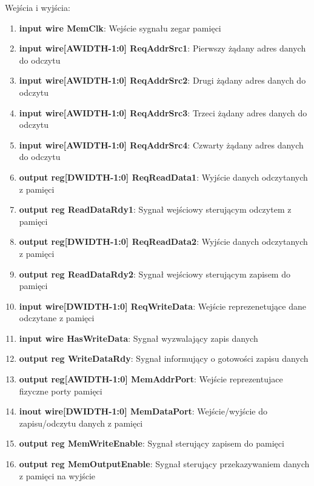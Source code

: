 \documentclass[12pt, a4paper]{article}
\begin{document}
Wejścia i wyjścia:
\begin{enumerate}
    \item \textbf{\fontsize{11}{10}\selectfont input wire MemClk}: Wejście sygnału zegar pamięci
    \item \textbf{\fontsize{11}{10}\selectfont input wire[AWIDTH-1:0] ReqAddrSrc1}: Pierwszy żądany adres danych do odczytu 
    \item \textbf{\fontsize{11}{10}\selectfont input wire[AWIDTH-1:0] ReqAddrSrc2}: Drugi żądany adres danych do odczytu 
    \item \textbf{\fontsize{11}{10}\selectfont input wire[AWIDTH-1:0] ReqAddrSrc3}: Trzeci żądany adres danych do odczytu 
    \item \textbf{\fontsize{11}{10}\selectfont input wire[AWIDTH-1:0] ReqAddrSrc4}: Czwarty żądany adres danych do odczytu 
    \item \textbf{\fontsize{11}{10}\selectfont output reg[DWIDTH-1:0] ReqReadData1}: Wyjście danych odczytanych z pamięci
    \item \textbf{\fontsize{11}{10}\selectfont output reg ReadDataRdy1}: Sygnał wejściowy sterującym odczytem z pamięci
    \item \textbf{\fontsize{11}{10}\selectfont output reg[DWIDTH-1:0] ReqReadData2}: Wyjście danych odczytanych z pamięci
    \item \textbf{\fontsize{11}{10}\selectfont output reg ReadDataRdy2}: Sygnał wejściowy sterującym zapisem do pamięci
    \item \textbf{\fontsize{11}{10}\selectfont input wire[DWIDTH-1:0] ReqWriteData}: Wejście reprezenetujące dane odczytane z pamięci
    \item \textbf{\fontsize{11}{10}\selectfont input wire HasWriteData}: Sygnał wyzwalający zapis danych
    \item \textbf{\fontsize{11}{10}\selectfont output reg WriteDataRdy}: Sygnał informujący o gotowości zapisu danych
    \item \textbf{\fontsize{11}{10}\selectfont output reg[AWIDTH-1:0] MemAddrPort}: Wejście reprezentujace fizyczne porty pamięci
    \item \textbf{\fontsize{11}{10}\selectfont inout wire[DWIDTH-1:0] MemDataPort}: Wejście/wyjście do zapisu/odczytu danych z pamięci 
    \item \textbf{\fontsize{11}{10}\selectfont output reg MemWriteEnable}: Sygnał sterujący zapisem do pamięci
    \item \textbf{\fontsize{11}{10}\selectfont output reg MemOutputEnable}: Sygnał sterujący przekazywaniem danych z pamięci na wyjście 
\end{enumerate}
\end{document}
